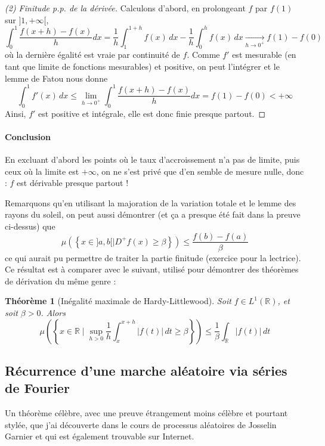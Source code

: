 \documentclass[a4paper, 11pt]{article}
\def\R{\mathbb{R}}
\newtheorem*{theorem}{Théorème}
\begin{document}
\begin{proof}[(2) Finitude p.p. de la dérivée]
Calculons d'abord, en prolongeant $f$ par $f(1)$ sur $]1,+\infty[$,
\[
  \int_0^1 \frac{f(x+h) - f(x)}{h}dx =
    \frac{1}{h} \int_1^{1+h} f(x)\,dx - \frac{1}{h} \int_0^h f(x)\,dx
    \underset{h \to 0^+}{\longrightarrow} f(1) - f(0)
\]
où la dernière égalité est vraie par continuité de $f$. Comme $f'$ est mesurable
(en tant que limite de fonctions mesurables) et positive, on peut l'intégrer et
le lemme de Fatou nous donne
\[ \int_0^{1} f'(x)\,dx \leq \lim_{h \to 0^+}
  \int_0^{1} \frac{f(x+h) - f(x)}{h}dx =
  f(1)- f(0) < +\infty \]
Ainsi, $f'$ est positive et intégrale, elle est donc finie presque partout.
\end{proof}

\paragraph{Conclusion} En excluant d'abord les points où le taux d'accroissement
n'a pas de limite, puis ceux où la limite est $+\infty$, on ne s'est privé que
d'en semble de mesure nulle, donc : $f$ est dérivable presque partout !

Remarquons qu'en utilisant la majoration de la variation totale et le lemme des
rayons du soleil, on peut aussi démontrer (et ça a presque été fait dans la
preuve ci-dessus) que
\[ \mu\left( \left\{ x \in ]a,b[ \mid D^+f(x) \geq \beta \right\} \right)
  \leq \frac{f(b)-f(a)}{\beta} \]
ce qui aurait pu permettre de traiter la partie finitude (exercice pour la
lectrice). Ce résultat est à comparer avec le suivant, utilisé pour démontrer
des théorèmes de dérivation du même genre :
\begin{theorem}[Inégalité maximale de Hardy-Littlewood]
  Soit $f \in L^1(\R)$, et soit $\beta > 0$. Alors
  \[ \mu\left( \left\{ x \in \R \mid \sup_{h > 0} \frac{1}{h} \int_x^{x+h}
        |f(t)|\,dt \geq \beta \right\} \right)
    \leq \frac{1}{\beta} \int_\R |f(t)|\,dt \]
\end{theorem}

\newpage

\subsection{Récurrence d'une marche aléatoire via séries de Fourier}

Un théorème célèbre, avec une preuve étrangement moins célèbre et pourtant
stylée, que j'ai découverte dans le cours de processus aléatoires de Josselin
Garnier et qui est également trouvable sur Internet.
\end{document}
